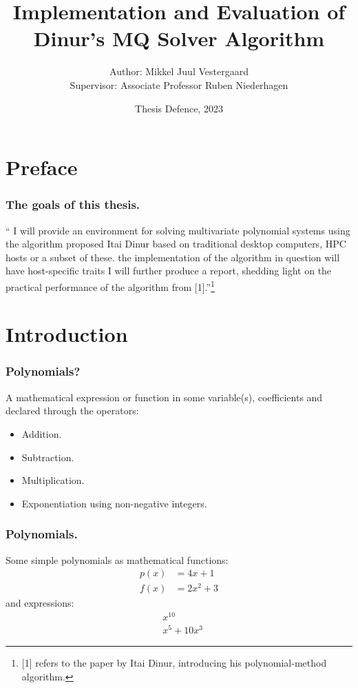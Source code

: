 \documentclass{beamer}
\title{Implementation and Evaluation of Dinur's MQ Solver Algorithm}
\author{Author: Mikkel Juul Vestergaard\\Supervisor: Associate Professor Ruben Niederhagen}
\institute{Department of Mathematics and Computer Science\\University of Southern Denmark}
\date{Thesis Defence, 2023}
\begin{document}
\frame{\titlepage}

\section{Preface}
\begin{frame}
    \frametitle{The goals of this thesis.}
    \enquote{\textelp{} I will provide an environment for solving multivariate polynomial systems using the algorithm proposed Itai Dinur \textelp{} based on traditional desktop computers, HPC hosts or a subset of these. \textelp{} the implementation of the algorithm in question will have host-specific traits \textelp{} I will further produce a report, shedding light on the practical performance of the algorithm from [1].}\footnote{[1] refers to the paper by Itai Dinur, introducing his polynomial-method algorithm.}
\end{frame}

\section{Introduction}
\begin{frame}
    \frametitle{Polynomials?}
    A mathematical expression or function in some variable(s), coefficients and declared through the operators:
    \begin{itemize}
        \item Addition.
        \item Subtraction.
        \item Multiplication.
        \item Exponentiation using non-negative integers.
    \end{itemize}
\end{frame}

\begin{frame}
    \frametitle{Polynomials.}
    Some simple polynomials as mathematical functions:
    \begin{equation*}
        \begin{split}
            p(x) &= 4x + 1\\
            f(x) &= 2x^2 + 3
        \end{split}
    \end{equation*}
    and expressions:
    \begin{equation*}
        \begin{split}
            &x^{10}\\
            &x^5 + 10x^3
        \end{split}
    \end{equation*}

\end{frame}
\end{document}
